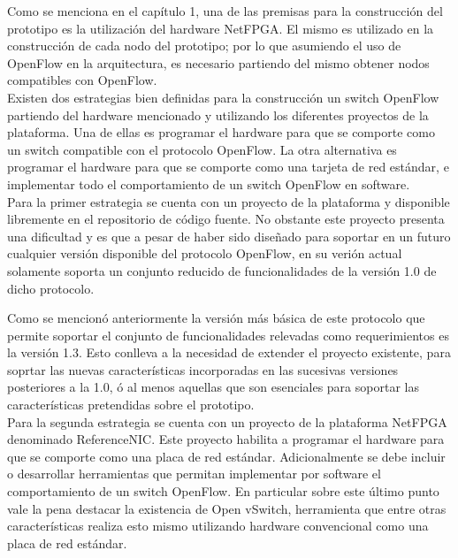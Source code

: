 Como se menciona en el cap\'itulo 1, una de las premisas para la construcción del prototipo es la utilizaci\'on del hardware NetFPGA. El mismo es utilizado en la construcción de cada nodo del prototipo; por lo que asumiendo el uso de OpenFlow en la arquitectura, es necesario partiendo del mismo obtener nodos compatibles con OpenFlow.\\ 

Existen dos estrategias bien definidas para la construcci\'on un switch OpenFlow partiendo del hardware mencionado y utilizando los diferentes proyectos de la plataforma. Una de ellas es programar el hardware para que se comporte como un switch compatible con el protocolo OpenFlow. La otra alternativa es programar el hardware para que se comporte como una tarjeta de red estándar, e implementar todo el comportamiento de un switch OpenFlow en software.\\

Para la primer estrategia se cuenta con un proyecto de la plataforma y disponible libremente en el repositorio de c\'odigo fuente. No obstante este proyecto presenta una dificultad y es que a pesar de haber sido dise\~nado para soportar en un futuro cualquier versi\'on disponible del protocolo OpenFlow, en su veri\'on actual solamente soporta un conjunto reducido de funcionalidades de la versi\'on 1.0 de dicho protocolo. 

Como se mencion\'o anteriormente la versi\'on m\'as b\'asica de este protocolo que permite soportar el conjunto de funcionalidades relevadas como requerimientos es la versi\'on 1.3. Esto conlleva a la necesidad de extender el proyecto existente, para soprtar las nuevas caracter\'isticas incorporadas en las sucesivas versiones posteriores a la 1.0, \'o al menos aquellas que son esenciales para soportar las caracter\'isticas pretendidas sobre el prototipo.\\

Para la segunda estrategia se cuenta con un proyecto de la plataforma NetFPGA denominado ReferenceNIC. Este proyecto habilita a programar el hardware para que se comporte como una placa de red estándar. Adicionalmente se debe incluir o desarrollar herramientas que permitan implementar por software el comportamiento de un switch OpenFlow. En particular sobre este \'ultimo punto vale la pena destacar la existencia de Open vSwitch, herramienta que entre otras caracter\'isticas realiza esto mismo utilizando hardware convencional como una placa de red estándar.\\


